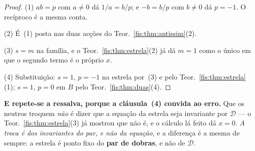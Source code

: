 \documentclass[livro.tex]{subfiles}
\begin{document}
\begin{proof}
(1) $ab=p$ com $a\neq0$ dá $1/a=b/p$; e $-b=b/p$ com $b\neq0$ dá $p=-1$. O
recíproco é a mesma conta.

(2) É~(1) posta nas duas acções do Teor.~\ref{fis:thm:antissim}(2).

(3) $s=m$ na família, e o Teor.~\ref{fis:thm:estrela}(2) já dá $m=1$ como o único
em que o segundo termo é o próprio $x$.

(4) Substituição: $s=1$, $p=-1$ na estrela por~(3) e pelo
Teor.~\ref{fis:thm:estrela}(1); $s=1$, $p=0$ em $B$ pelo
Teor.~\ref{fis:thm:duas}(4).
\end{proof}

\medskip\noindent\textbf{E repete-se a ressalva, porque a cláusula~(4) convida ao
erro.} Que os neutros troquem \emph{não} é dizer que a equação da estrela seja
invariante por $\mathcal{D}$ --- o Teor.~\ref{fis:thm:estrela}(3) já mostrou que
não é, e o cálculo lá feito dá $x=0$. \emph{A troca é dos invariantes do par, e
não da equação}, e a diferença é a mesma de sempre: a estrela é ponto fixo do
\textbf{par de dobras}, e não de $\mathcal{D}$.
\end{document}
